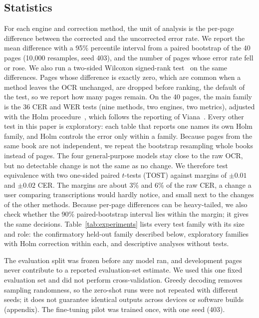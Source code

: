 \documentclass[conference]{IEEEtran}
\begin{document}
\subsection{Statistics}
For each engine and correction method, the unit of analysis is the per-page difference between the corrected and the uncorrected error rate. We report the mean difference with a 95\% percentile interval from a paired bootstrap of the 40 pages (10{,}000 resamples, seed 403), and the number of pages whose error rate fell or rose. We also run a two-sided Wilcoxon signed-rank test~\cite{wilcoxon1945} on the same differences. Pages whose difference is exactly zero, which are common when a method leaves the OCR unchanged, are dropped before ranking, the default of the test, so we report how many pages remain. On the 40 pages, the main family is the 36 CER and WER tests (nine methods, two engines, two metrics), adjusted with the Holm procedure~\cite{holm1979}, which follows the reporting of Viana~\cite{viana2026reframing}. Every other test in this paper is exploratory: each table that reports one names its own Holm family, and Holm controls the error only within a family. Because pages from the same book are not independent, we repeat the bootstrap resampling whole books instead of pages. The four general-purpose models stay close to the raw OCR, but no detectable change is not the same as no change. We therefore test equivalence with two one-sided paired $t$-tests (TOST) against margins of $\pm0.01$ and $\pm0.02$ CER. The margins are about 3\% and 6\% of the raw CER, a change a user comparing transcriptions would hardly notice, and small next to the changes of the other methods. Because per-page differences can be heavy-tailed, we also check whether the 90\% paired-bootstrap interval lies within the margin; it gives the same decisions. Table~\ref{tab:experiments} lists every test family with its size and role: the confirmatory held-out family described below, exploratory families with Holm correction within each, and descriptive analyses without tests.

The evaluation split was frozen before any model ran, and development pages never contribute to a reported evaluation-set estimate. We used this one fixed evaluation set and did not perform cross-validation. Greedy decoding removes sampling randomness, so the zero-shot runs were not repeated with different seeds; it does not guarantee identical outputs across devices or software builds (appendix). The fine-tuning pilot was trained once, with one seed (403).
\end{document}
